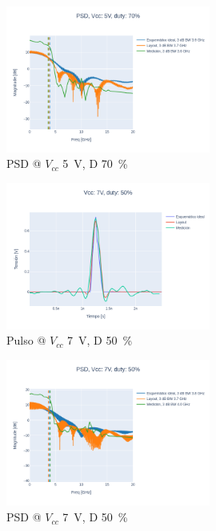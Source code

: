 \begin{figure}
  \centering
    \includegraphics[width=0.6\textwidth]{images/plots/Vcc_5V_duty_70_psd.png}
    \caption{PSD @ $V_{cc}$ \qty{5}{\volt}, D \qty{70}{\percent} }
    \label{fig:psd_5v_70}
\end{figure}

\begin{figure}
  \centering
    \includegraphics[width=0.6\textwidth]{images/plots/Vcc_7V_duty_50_time_domain.png}
    \caption{Pulso @ $V_{cc}$ \qty{7}{\volt}, D \qty{50}{\percent} }
    \label{fig:plots_7v_50}
\end{figure}

\begin{figure}
  \centering
    \includegraphics[width=0.6\textwidth]{images/plots/Vcc_7V_duty_50_psd.png}
    \caption{PSD @ $V_{cc}$ \qty{7}{\volt}, D \qty{50}{\percent} }
    \label{fig:psd_7v_50}
\end{figure}


